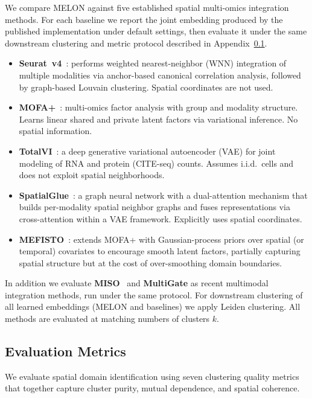 \documentclass{article}
\theoremstyle{plain}
\theoremstyle{definition}
\begin{document}
We compare MELON against five established spatial multi-omics integration methods. For each baseline we report the joint embedding produced by the published implementation under default settings, then evaluate it under the same downstream clustering and metric protocol described in Appendix~\ref{app:metrics}.

\begin{itemize}
    \item \textbf{Seurat~v4}~\cite{hao2021seurat}: performs weighted nearest-neighbor (WNN) integration of multiple modalities via anchor-based canonical correlation analysis, followed by graph-based Louvain clustering. Spatial coordinates are not used.
    \item \textbf{MOFA+}~\cite{argelaguet2020mofa}: multi-omics factor analysis with group and modality structure. Learns linear shared and private latent factors via variational inference. No spatial information.
    \item \textbf{TotalVI}~\cite{gayoso2021totalvi}: a deep generative variational autoencoder (VAE) for joint modeling of RNA and protein (CITE-seq) counts. Assumes i.i.d.\ cells and does not exploit spatial neighborhoods.
    \item \textbf{SpatialGlue}~\cite{long2024spatialglue}: a graph neural network with a dual-attention mechanism that builds per-modality spatial neighbor graphs and fuses representations via cross-attention within a VAE framework. Explicitly uses spatial coordinates.
    \item \textbf{MEFISTO}~\cite{velten2022mefisto}: extends MOFA+ with Gaussian-process priors over spatial (or temporal) covariates to encourage smooth latent factors, partially capturing spatial structure but at the cost of over-smoothing domain boundaries.
\end{itemize}

In addition we evaluate \textbf{MISO}~\cite{coleman2025miso} and \textbf{MultiGate} as recent multimodal integration methods, run under the same protocol. For downstream clustering of all learned embeddings (MELON and baselines) we apply Leiden clustering. All methods are evaluated at matching numbers of clusters $k$.

\subsection{Evaluation Metrics}\label{app:metrics}

We evaluate spatial domain identification using seven clustering quality metrics that together capture cluster purity, mutual dependence, and spatial coherence.
\end{document}
